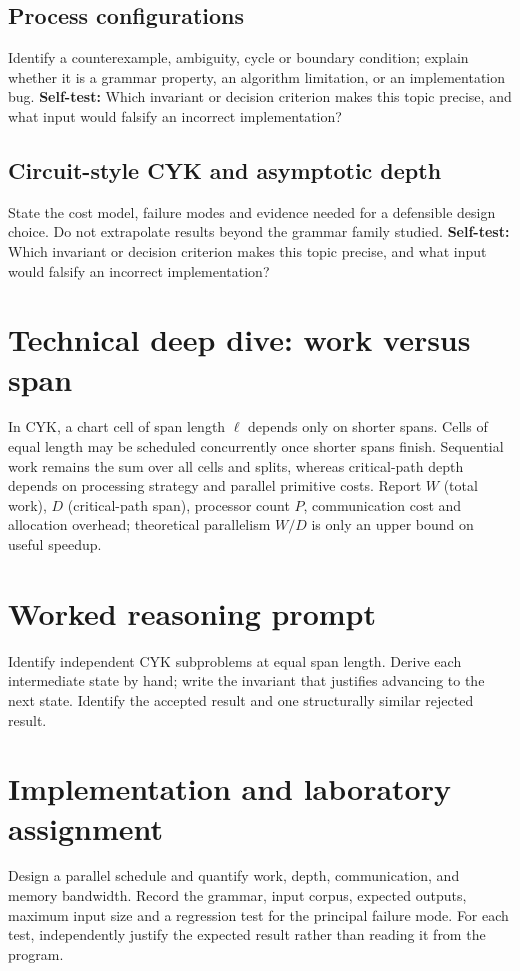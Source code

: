 \documentclass[11pt,letterpaper]{article}
\begin{document}
\subsection{Process configurations}
Identify a counterexample, ambiguity, cycle or boundary condition; explain whether it is a grammar property, an algorithm limitation, or an implementation bug.
\textbf{Self-test:} Which invariant or decision criterion makes this topic precise, and what input would falsify an incorrect implementation?
\subsection{Circuit-style CYK and asymptotic depth}
State the cost model, failure modes and evidence needed for a defensible design choice. Do not extrapolate results beyond the grammar family studied.
\textbf{Self-test:} Which invariant or decision criterion makes this topic precise, and what input would falsify an incorrect implementation?
\section{Technical deep dive: work versus span}
In CYK, a chart cell of span length $\ell$ depends only on shorter spans. Cells of equal length may be scheduled concurrently once shorter spans finish. Sequential work remains the sum over all cells and splits, whereas critical-path depth depends on processing strategy and parallel primitive costs. Report $W$ (total work), $D$ (critical-path span), processor count $P$, communication cost and allocation overhead; theoretical parallelism $W/D$ is only an upper bound on useful speedup.
\section{Worked reasoning prompt}
Identify independent CYK subproblems at equal span length. Derive each intermediate state by hand; write the invariant that justifies advancing to the next state. Identify the accepted result and one structurally similar rejected result.
\section{Implementation and laboratory assignment}
Design a parallel schedule and quantify work, depth, communication, and memory bandwidth. Record the grammar, input corpus, expected outputs, maximum input size and a regression test for the principal failure mode. For each test, independently justify the expected result rather than reading it from the program.
\end{document}
